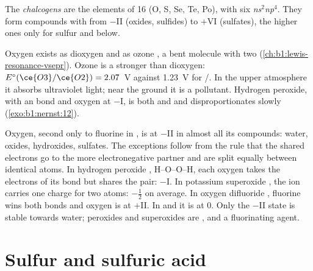 \begin{definition}[Chalcogens]\label{def:b1:p-block-16-18:chalcogen}
The \emph{chalcogens} are the elements of  16
(O, S, Se, Te, Po), with six  \textit{ns}$^2$\textit{np}$^4$.
They form compounds with  from $-$II (oxides, sulfides)
to $+$VI (sulfates), the higher ones only for sulfur and below.
\end{definition}

Oxygen exists as dioxygen  and as ozone , a bent molecule
with two  (\cref{ch:b1:lewis-resonance-vsepr}). Ozone
is a stronger  than dioxygen: $E^\circ(\ce{O3}/\ce{O2}) = 2.07$~V
against 1.23~V for /. In the upper atmosphere it absorbs
ultraviolet light; near the ground it is a pollutant. Hydrogen peroxide,
with an  bond and oxygen at $-$I, is both  and 
and disproportionates slowly (\cref{exo:b1:nernst:12}).

\begin{example}
Oxygen, second only to fluorine in , is at $-$II in
almost all its compounds: water, oxides, hydroxides, sulfates. The
exceptions follow from the rule that the shared electrons go to the more
electronegative partner and are split equally between identical atoms. In
hydrogen peroxide , H--O--O--H, each oxygen takes the electrons of
its  bond but shares the  pair: $-$I. In potassium
superoxide , the ion  carries one charge for two atoms:
$-\frac12$ on average. In oxygen difluoride , fluorine wins both
bonds and oxygen is at $+$II. In  and  it is at 0. Only the
$-$II state is stable towards water; peroxides and superoxides are
, and  a fluorinating agent.
\end{example}

\section{Sulfur and sulfuric acid}

